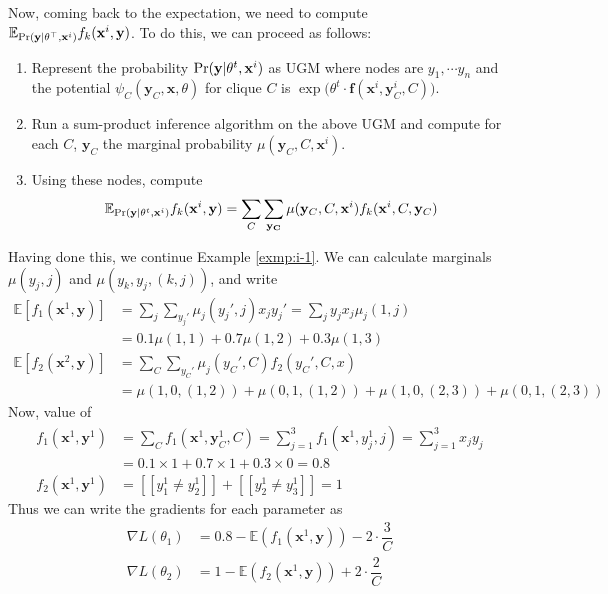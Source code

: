 Now, coming back to the expectation, we need to compute \\ $\mathbb{E}_{\text{Pr}(\mathbf y|\theta^\top, \mathbf x^i)}f_k(\mathbf x^i, \mathbf y)$. To do this, we can proceed as follows:
\begin{enumerate}
	\item Represent the probability $\text{Pr}(\mathbf y|\theta^t, \mathbf x^i)$ as UGM where nodes are $y_1, \cdots y_n$ and the potential $\psi_C(\mathbf y_C, \mathbf x, \theta)$ for clique $C$ is $\exp\big(\theta^t \cdot \mathbf f(\mathbf x^i, \mathbf y_C^i, C)\big)$.
	\item Run a sum-product inference algorithm on the above UGM and compute for each $C$, $\mathbf y_C$ the marginal probability $\mu(\mathbf y_C, C, \mathbf x^i)$.
	\item Using these nodes, compute 
	\[\mathbb{E}_{\text{Pr}(\mathbf y|\theta^t, \mathbf x^i)}f_k(\mathbf x^i, \mathbf y) = \sum_C\sum_\mathbf{y_C} \mu(\mathbf y_C, C, \mathbf x^i)f_k(\mathbf x^i, C, \mathbf y_C)\]
\end{enumerate}
Having done this, we continue Example \ref{exmp:i-1}. We can calculate marginals $\mu(y_j, j)$ and $\mu(y_k, y_j, (k,j))$, and write
\begin{align*}
\mathbb{E}[f_1(\mathbf x^1, \mathbf y)] &= \sum_j \sum_{y_j'} \mu_j(y_j', j)x_jy_j' =\sum_j y_jx_j \mu_j(1,j) \\&= 0.1\mu(1,1) + 0.7 \mu(1,2) + 0.3\mu(1,3) \\
\mathbb{E}[f_2(\mathbf x^2, \mathbf y)] &= \sum_C \sum_{y_C'} \mu_j(y_C', C)f_2(y_C', C, x)\\&= \mu(1,0,(1,2)) + \mu(0,1, (1,2)) + \mu(1,0,(2,3)) + \mu(0,1, (2,3))
\end{align*}
Now, value of 
\begin{align*}
f_1(\mathbf x^1, \mathbf y^1) &= \sum_C f_1(\mathbf x^1, \mathbf y^1_C, C) = \sum_{j=1}^3 f_1(\mathbf x^1, y^1_j, j) = \sum_{j=1}^3 x_jy_j\\
&= 0.1 \times 1 + 0.7 \times 1 + 0.3 \times 0 = 0.8 \\
f_2(\mathbf x^1, \mathbf y^1) &= [\![y_1^1 \neq y_2^1]\!] + [\![y_2^1 \neq y_3^1]\!] = 1
\end{align*}
Thus we can write the gradients for each parameter as
\begin{align*}
\nabla L(\theta_1) &= 0.8 - \mathbb{E}(f_1(\mathbf x^1, \mathbf y)) - 2\cdot\dfrac{3}{C} \\
\nabla L(\theta_2)&=  1 - \mathbb{E}(f_2(\mathbf x^1, \mathbf y)) + 2\cdot\dfrac{2}{C} 
\end{align*}
